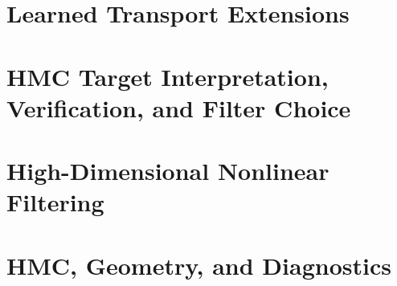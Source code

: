 \documentclass[12pt,a4paper,openany]{book}
\begin{document}
\part{Learned Transport Extensions}




\part{HMC Target Interpretation, Verification, and Filter Choice}





\part{High-Dimensional Nonlinear Filtering}









\part{HMC, Geometry, and Diagnostics}
















\end{document}
